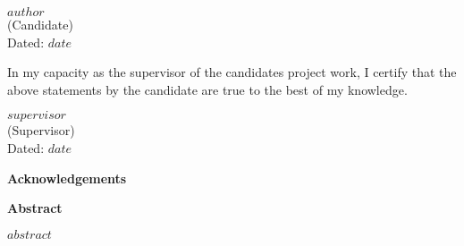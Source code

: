 \vspace{2cm}

\begin{flushright}
$author$\\
(Candidate)\\
Dated: $date$
\end{flushright}

In my capacity as the supervisor of the candidates project work, I certify that the above statements by the candidate are true to the best of my knowledge.

\vspace{2cm}

\begin{flushright}
$supervisor$\\
(Supervisor)\\
Dated: $date$
\end{flushright}

\clearpage
\begingroup
    \null
    \thispagestyle{empty}%
    \hypersetup{pageanchor=false}%
    \clearpage
\endgroup

\newpage
\restoregeometry

\begin{center}
\textbf{\Large Acknowledgements}
\end{center}

\begingroup
\obeylines
%
\endgroup%

\clearpage
\begingroup
    \null
    \thispagestyle{empty}%
    \hypersetup{pageanchor=false}%
    \clearpage
\endgroup

\begin{center}
    \textbf{\Large Abstract}
\end{center}
$abstract$
\newpage
\clearpage
\begingroup
    \null
    \thispagestyle{empty}%
    \hypersetup{pageanchor=false}%
    \clearpage
\endgroup
